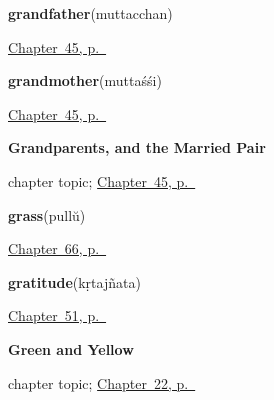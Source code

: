 \noindent\begin{minipage}[t]{\linewidth}
\raggedright
\textbf{grandfather}\enspace\emph{}\enspace(muttacchan)\par
\footnotesize \hyperref[ch:ml-grandparents]{Chapter~45, p.~\pageref*{ch:ml-grandparents}}
\end{minipage}\par\smallskip

\noindent\begin{minipage}[t]{\linewidth}
\raggedright
\textbf{grandmother}\enspace\emph{}\enspace(muttaśśi)\par
\footnotesize \hyperref[ch:ml-grandparents]{Chapter~45, p.~\pageref*{ch:ml-grandparents}}
\end{minipage}\par\smallskip

\noindent\begin{minipage}[t]{\linewidth}
\raggedright
\textbf{Grandparents, and the Married Pair}\par
\footnotesize chapter topic; \hyperref[ch:ml-grandparents]{Chapter~45, p.~\pageref*{ch:ml-grandparents}}
\end{minipage}\par\smallskip

\noindent\begin{minipage}[t]{\linewidth}
\raggedright
\textbf{grass}\enspace\emph{}\enspace(pullŭ)\par
\footnotesize \hyperref[ch:ml-out-in-the-paddy]{Chapter~66, p.~\pageref*{ch:ml-out-in-the-paddy}}
\end{minipage}\par\smallskip

\noindent\begin{minipage}[t]{\linewidth}
\raggedright
\textbf{gratitude}\enspace\emph{}\enspace(kṛtajñata)\par
\footnotesize \hyperref[ch:ml-courtesy]{Chapter~51, p.~\pageref*{ch:ml-courtesy}}
\end{minipage}\par\smallskip

\noindent\begin{minipage}[t]{\linewidth}
\raggedright
\textbf{Green and Yellow}\par
\footnotesize chapter topic; \hyperref[ch:ml-green-and-yellow]{Chapter~22, p.~\pageref*{ch:ml-green-and-yellow}}
\end{minipage}\par\smallskip

